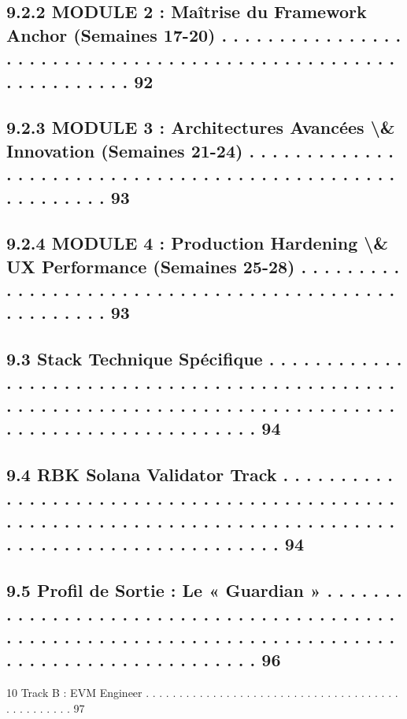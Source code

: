 \documentclass[12pt,landscape,a4paper]{article}
\begin{document}
\subsection{9.2.2               MODULE 2 : Maîtrise du Framework Anchor (Semaines 17-20) . . . . . . . . . . . . . . . . . . . . . . . . . . . . . . . . . . . . . . . . . . . . . . . . . . . . . . . . . . . . . 92}
\subsection{9.2.3               MODULE 3 : Architectures Avancées \textbackslash{}& Innovation (Semaines 21-24) . . . . . . . . . . . . . . . . . . . . . . . . . . . . . . . . . . . . . . . . . . . . . . . . . . . . . . . . 93}
\subsection{9.2.4               MODULE 4 : Production Hardening \textbackslash{}& UX Performance (Semaines 25-28) . . . . . . . . . . . . . . . . . . . . . . . . . . . . . . . . . . . . . . . . . . . . . . . . . . . . 93}
\subsection{9.3     Stack Technique Spécifique . . . . . . . . . . . . . . . . . . . . . . . . . . . . . . . . . . . . . . . . . . . . . . . . . . . . . . . . . . . . . . . . . . . . . . . . . . . . . . . . . . . . . . . . . . . . . . . . . . . . . . 94}
\subsection{9.4     RBK Solana Validator Track . . . . . . . . . . . . . . . . . . . . . . . . . . . . . . . . . . . . . . . . . . . . . . . . . . . . . . . . . . . . . . . . . . . . . . . . . . . . . . . . . . . . . . . . . . . . . . . . . . . . . . 94}
\subsection{9.5     Profil de Sortie : Le « Guardian » . . . . . . . . . . . . . . . . . . . . . . . . . . . . . . . . . . . . . . . . . . . . . . . . . . . . . . . . . . . . . . . . . . . . . . . . . . . . . . . . . . . . . . . . . . . . . . . . . 96}
\vspace{0.5em}
10    Track B : EVM Engineer . . . . . . . . . . . . . . . . . . . . . . . . . . . . . . . . . . . . . . . . . . . . . . . . 97\\
\end{document}
